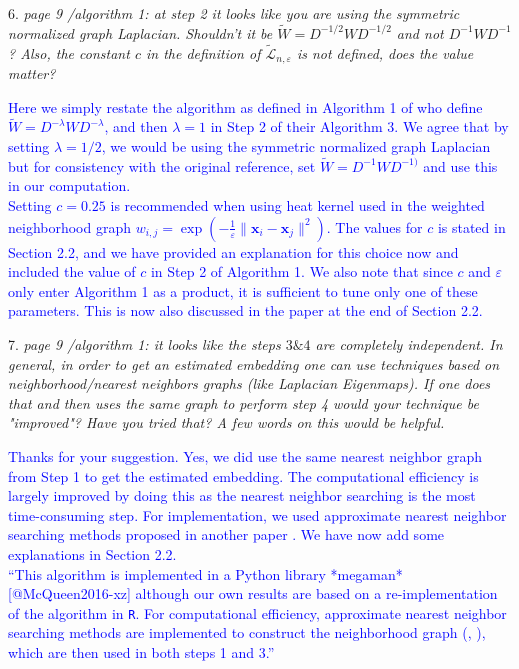 \documentclass{article}
\begin{document}
6. \textit{page 9 /algorithm 1: at step 2 it looks like you are using the symmetric normalized graph Laplacian. Shouldn't it be \(\tilde{W}=D^{-1 / 2} W D^{-1 / 2}\) and not \(D^{-1} W D^{-1}\)? Also, the constant \(c\) in the definition of \(\tilde{\mathcal{L}}_{n, \varepsilon}\) is not defined, does the value matter?}

   \textcolor{blue}{Here we simply restate the algorithm as defined in Algorithm 1 of \textcite{Perrault-Joncas2013-pq} who define \(\tilde{W}=D^{-\lambda} W D^{- \lambda}\), and then $\lambda=1$ in Step 2 of their Algorithm 3. We agree that by setting $\lambda=1/2$, we would be using the symmetric normalized graph Laplacian but for consistency with the original reference, set \(\tilde{W}=D^{-1} W D^{-1)} \) and use this in our computation. \\
   Setting \(c=0.25\) is recommended when using heat kernel used in the weighted neighborhood graph $w_{i,j}=\exp(-\frac{1}{\varepsilon}\|\bm{x}_i-\bm{x}_j\|^2)$. The values for \(c\) is stated in Section 2.2, and we have provided an explanation for this choice now and included the value of \(c\) in Step 2 of Algorithm 1. We also note that since \(c\) and ${\varepsilon}$ only enter Algorithm 1 as a product, it is sufficient to tune only one of these parameters. This is now also discussed in the paper at the end of Section 2.2.
   }

7. \textit{page 9 /algorithm 1: it looks like the steps \(3 \& 4\) are completely independent. In general, in order to get an estimated embedding one can use techniques based on neighborhood/nearest neighbors graphs (like Laplacian Eigenmaps). If one does that and then uses the same graph to perform step 4 would your technique be "improved"? Have you tried that? A few words on this would be helpful.}

   \textcolor{blue}{Thanks for your suggestion. Yes, we did use the same nearest neighbor graph from Step 1 to get the estimated embedding. The computational efficiency is largely improved by doing this as the nearest neighbor searching is the most time-consuming step. For implementation, we used approximate nearest neighbor searching methods proposed in another paper \cite{Cheng2021-dh}. We have now add some explanations in Section 2.2. \\
  ``This algorithm is implemented in a Python library *megaman* [@McQueen2016-xz] although our own results are based on a re-implementation of the algorithm in \texttt{R}. For computational efficiency, approximate nearest neighbor searching methods are implemented to construct the neighborhood graph (\cite{Cheng2021-dh}, \cite{Perrault-Joncas2013-pq}), which are then used in both steps 1 and 3.''
   }
\end{document}
